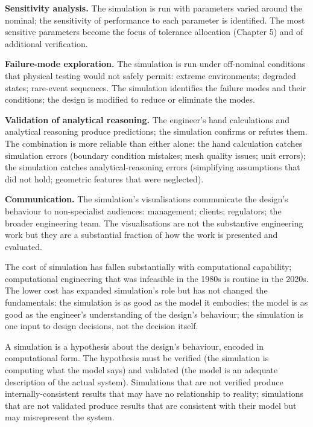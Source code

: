 \textbf{Sensitivity analysis.} The simulation is run with parameters varied around the nominal; the sensitivity of performance to each parameter is identified. The most sensitive parameters become the focus of tolerance allocation (Chapter 5) and of additional verification.

\textbf{Failure-mode exploration.} The simulation is run under off-nominal conditions that physical testing would not safely permit: extreme environments; degraded states; rare-event sequences. The simulation identifies the failure modes and their conditions; the design is modified to reduce or eliminate the modes.

\textbf{Validation of analytical reasoning.} The engineer's hand calculations and analytical reasoning produce predictions; the simulation confirms or refutes them. The combination is more reliable than either alone: the hand calculation catches simulation errors (boundary condition mistakes; mesh quality issues; unit errors); the simulation catches analytical-reasoning errors (simplifying assumptions that did not hold; geometric features that were neglected).

\textbf{Communication.} The simulation's visualisations communicate the design's behaviour to non-specialist audiences: management; clients; regulators; the broader engineering team. The visualisations are not the substantive engineering work but they are a substantial fraction of how the work is presented and evaluated.

The cost of simulation has fallen substantially with computational capability; computational engineering that was infeasible in the 1980s is routine in the 2020s. The lower cost has expanded simulation's role but has not changed the fundamentals: the simulation is as good as the model it embodies; the model is as good as the engineer's understanding of the design's behaviour; the simulation is one input to design decisions, not the decision itself.

\begin{principle}
A simulation is a hypothesis about the design's behaviour, encoded in computational form. The hypothesis must be verified (the simulation is computing what the model says) and validated (the model is an adequate description of the actual system). Simulations that are not verified produce internally-consistent results that may have no relationship to reality; simulations that are not validated produce results that are consistent with their model but may misrepresent the system.
\end{principle}

